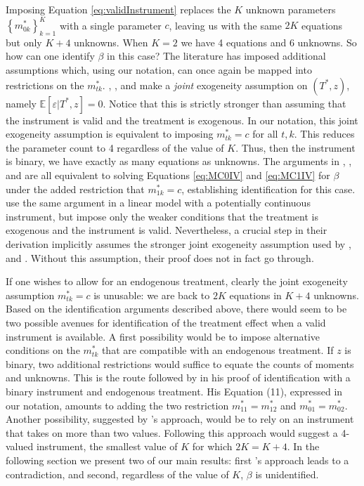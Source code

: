 Imposing Equation \ref{eq:validInstrument} replaces the $K$ unknown parameters $\left\{ m^*_{0k}\right\}_{k=1}^K $ with a single parameter $c$, leaving us with the same $2K$ equations but only $K+4$ unknowns.
When $K=2$ we have 4 equations and 6 unknowns.
So how can one identify $\beta$ in this case?
The literature has imposed additional assumptions which, using our notation, can once again be mapped into restrictions on the $m_{tk}^*$.
\cite{BBS}, \cite{KRS}, and \cite{Mahajan} make a \emph{joint} exogeneity assumption on $(T^*,z)$, namely $\mathbb{E}[\varepsilon|T^*,z]=0$.
Notice that this is strictly stronger than assuming that the instrument is valid and the treatment is exogenous.
In our notation, this joint exogeneity assumption is equivalent to imposing $m_{tk}^*=c$ for all $t,k$.
This reduces the parameter count to 4 regardless of the value of $K$.
Thus, then the instrument is binary, we have exactly as many equations as unknowns.
The arguments in \cite{BBS}, \cite{KRS}, and \cite{Mahajan} are all equivalent to solving Equations \ref{eq:MC0IV} and \ref{eq:MC1IV} for $\beta$ under the added restriction that $m^*_{1k}=c$, establishing identification for this case.
\cite{FL} use the same argument in a linear model with a potentially continuous instrument, but impose only the weaker conditions that the treatment is exogenous and the instrument is valid. 
Nevertheless, a crucial step in their derivation implicitly assumes the stronger joint exogeneity assumption used by \cite{BBS}, \cite{KRS} and \cite{Mahajan}.
Without this assumption, their proof does not in fact go through.

If one wishes to allow for an endogenous treatment, clearly the joint exogeneity assumption $m_{tk}^*=c$ is unusable: we are back to $2K$ equations in $K+4$ unknowns.
Based on the identification arguments described above, there would seem to be two possible avenues for identification of the treatment effect when a valid instrument is available.
A first possibility would be to impose alternative conditions on the $m^*_{tk}$ that are compatible with an endogenous treatment.
If $z$ is binary, two additional restrictions would suffice to equate the counts of moments and unknowns.
This is the route followed by \cite{Mahajan} in his proof of identification with a binary instrument and endogenous treatment.
His Equation (11), expressed in our notation, amounts to adding the two restriction $m^*_{11} = m^*_{12}$ and $m^*_{01} = m^*_{02}$. 
Another possibility, suggested by \citeauthor{Lewbel}'s approach, would be to rely on an instrument that takes on more than two values.
Following this approach would suggest a 4-valued instrument, the smallest value of $K$ for which $2K = K+4$.
In the following section we present two of our main results: first \citeauthor{Mahajan}'s approach leads to a contradiction, and second, regardless of the value of $K$, $\beta$ is unidentified.  



